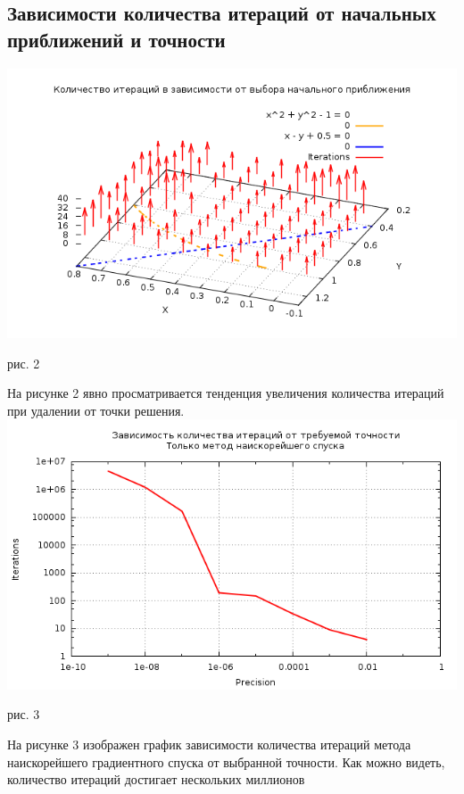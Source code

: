 \documentclass[a4paper, 12pt]{article}
\begin{document}
\subsection*{Зависимости количества итераций от начальных приближений и точности}
\vfil
	\includegraphics[width=\linewidth]{p0.png}\\
	\begin{center}
		рис. 2\\
	\end{center}
\vfil
	На рисунке 2 явно просматривается тенденция увеличения количества итераций при удалении от точки решения.\\
\newpage
\vfil
\noindent \includegraphics[width=\linewidth]{eps_gd.png}
	\begin{center}
		рис. 3\\
	\end{center}
\vfil
На рисунке 3 изображен график зависимости количества итераций метода наискорейшего градиентного спуска от выбранной точности. Как можно видеть, количество итераций достигает нескольких миллионов 
\end{document}
